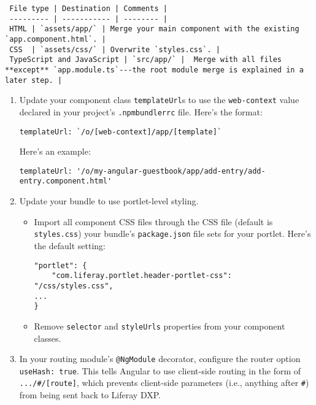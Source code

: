 \noindent\hrulefill

\begin{verbatim}
 File type | Destination | Comments |
 --------- | ----------- | -------- |
 HTML | `assets/app/` | Merge your main component with the existing `app.component.html`. |
 CSS  | `assets/css/` | Overwrite `styles.css`. |
 TypeScript and JavaScript | `src/app/` |  Merge with all files **except** `app.module.ts`---the root module merge is explained in a later step. |
\end{verbatim}

\noindent\hrulefill

\begin{enumerate}
\def\labelenumi{\arabic{enumi}.}
\setcounter{enumi}{3}
\item
  Update your component class \texttt{templateUrl}s to use the
  \texttt{web-context} value declared in your project's
  \texttt{.npmbundlerrc} file. Here's the format:

\begin{verbatim}
templateUrl: `/o/[web-context]/app/[template]`
\end{verbatim}

  Here's an example:

\begin{verbatim}
templateUrl: '/o/my-angular-guestbook/app/add-entry/add-entry.component.html'
\end{verbatim}
\item
  Update your bundle to use portlet-level styling.

  \begin{itemize}
  \item
    Import all component CSS files through the CSS file (default is
    \texttt{styles.css}) your bundle's \texttt{package.json} file sets
    for your portlet. Here's the default setting:

\begin{verbatim}
"portlet": {
    "com.liferay.portlet.header-portlet-css": "/css/styles.css",
...
}
\end{verbatim}
  \item
    Remove \texttt{selector} and \texttt{styleUrls} properties from your
    component classes.
  \end{itemize}
\item
  In your routing module's \texttt{@NgModule} decorator, configure the
  router option \texttt{useHash:\ true}. This tells Angular to use
  client-side routing in the form of \texttt{.../\#/{[}route{]}}, which
  prevents client-side parameters (i.e., anything after \texttt{\#})
  from being sent back to Liferay DXP.


\end{enumerate}
